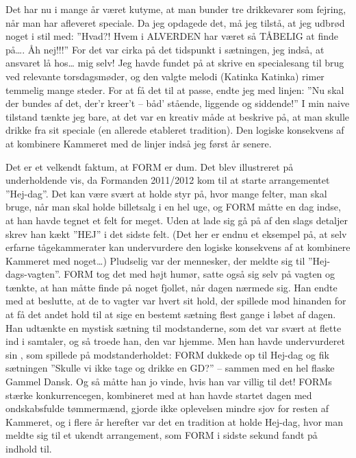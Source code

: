 Det har nu i mange år været kutyme, at man bunder tre drikkevarer som fejring, når man har afleveret speciale. Da jeg opdagede det, må jeg tilstå, at jeg udbrød noget i stil med: ''Hvad?! Hvem i ALVERDEN har været så TÅBELIG at finde på…. Åh nej!!!'' For det var cirka på det tidspunkt i sætningen, jeg indså, at ansvaret lå hos… mig selv! Jeg havde fundet på at skrive en specialesang til brug ved relevante torsdagsmøder, og den valgte melodi (Katinka Katinka) rimer temmelig mange steder. For at få det til at passe, endte jeg med linjen: ''Nu skal der bundes af det, der'r kreer't -- båd' stående, liggende og siddende!'' I min naive tilstand tænkte jeg bare, at det var en kreativ måde at beskrive på, at man skulle drikke fra sit speciale (en allerede etableret tradition). Den logiske konsekvens af at kombinere Kammeret med de linjer indså jeg først år senere.

Det er et velkendt faktum, at FORM er dum. Det blev illustreret på underholdende vis, da Formanden 2011/2012 kom til at starte arrangementet ''Hej-dag''. Det kan være svært at holde styr på, hvor mange felter, man skal bruge, når man skal holde billetsalg i en hel uge, og FORM måtte en dag indse, at han havde tegnet et felt for meget. Uden at lade sig gå på af den slags detaljer skrev han kækt ''HEJ'' i det sidste felt. (Det her er endnu et eksempel på, at selv erfarne tågekammerater kan undervurdere den logiske konsekvens af at kombinere Kammeret med noget…) Pludselig var der mennesker, der meldte sig til ''Hej-dags-vagten''. FORM tog det med højt humør, satte også sig selv på vagten og tænkte, at han måtte finde på noget fjollet, når dagen nærmede sig. Han endte med at beslutte, at de to vagter var hvert sit hold, der spillede mod hinanden for at få det andet hold til at sige en bestemt sætning flest gange i løbet af dagen. Han udtænkte en mystisk sætning til modstanderne, som det var svært at flette ind i samtaler, og så troede han, den var hjemme. Men han havde undervurderet sin \KASS{}, som spillede på modstanderholdet: FORM dukkede op til Hej-dag og fik sætningen ''Skulle vi ikke tage og drikke en GD?'' -- sammen med en hel flaske Gammel Dansk. Og så måtte han jo vinde, hvis han var villig til det! FORMs stærke konkurrencegen, kombineret med at han havde startet dagen med ondskabsfulde tømmermænd, gjorde ikke oplevelsen mindre sjov for resten af Kammeret, og i flere år herefter var det en tradition at holde Hej-dag, hvor man meldte sig til et ukendt arrangement, som FORM i sidste sekund fandt på indhold til.

